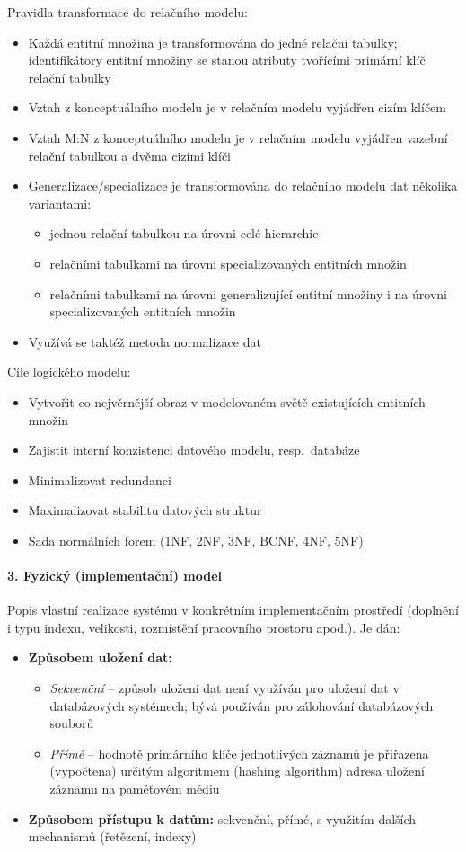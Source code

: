 \documentclass[12pt,a4paper]{article}
\begin{document}
Pravidla transformace do relačního modelu:
\begin{itemize}
  \item Každá entitní množina je transformována do jedné relační tabulky; identifikátory entitní množiny
    se stanou atributy tvořícími primární klíč relační tabulky
  \item Vztah z konceptuálního modelu je v relačním modelu vyjádřen cizím klíčem
  \item Vztah M:N z konceptuálního modelu je v relačním modelu vyjádřen vazební relační tabulkou
    a dvěma cizími klíči
  \item Generalizace/specializace je transformována do relačního modelu dat několika variantami:
    \begin{itemize}
      \item jednou relační tabulkou na úrovni celé hierarchie
      \item relačními tabulkami na úrovni specializovaných entitních množin
      \item relačními tabulkami na úrovni generalizující entitní množiny i na úrovni specializovaných
        entitních množin
    \end{itemize}
  \item Využívá se taktéž metoda normalizace dat
\end{itemize}

Cíle logického modelu:
\begin{itemize}
  \item Vytvořit co nejvěrnější obraz v modelovaném světě existujících entitních množin
  \item Zajistit interní konzistenci datového modelu, resp.~databáze
  \item Minimalizovat redundanci
  \item Maximalizovat stabilitu datových struktur
  \item Sada normálních forem (1NF, 2NF, 3NF, BCNF, 4NF, 5NF)
\end{itemize}

\paragraph{3. Fyzický (implementační) model}
Popis vlastní realizace systému v konkrétním implementačním prostředí (doplnění i typu indexu,
velikosti, rozmístění pracovního prostoru apod.). Je dán:
\begin{itemize}
  \item \textbf{Způsobem uložení dat:}
    \begin{itemize}
      \item \textit{Sekvenční} -- způsob uložení dat není využíván pro uložení dat v databázových
        systémech; bývá používán pro zálohování databázových souborů
      \item \textit{Přímé} -- hodnotě primárního klíče jednotlivých záznamů je přiřazena (vypočtena)
        určitým algoritmem (hashing algorithm) adresa uložení záznamu na paměťovém médiu
    \end{itemize}
  \item \textbf{Způsobem přístupu k datům:} sekvenční, přímé, s využitím dalších mechanismů
    (řetězení, indexy)
\end{itemize}
\end{document}
